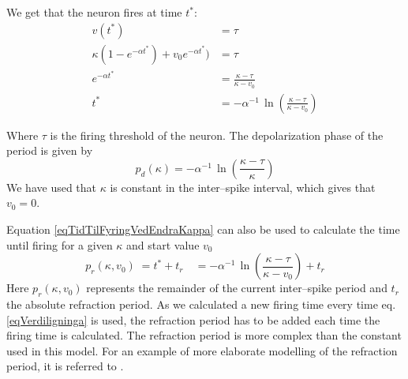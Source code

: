 We get that the neuron fires at time $t^*$:
\begin{equation}
	\begin{split}
			v(t^*) 					 							&= \tau \qquad 										\\	%
			\kappa (1-e^{-\alpha t^*}) + v_0 e^{-\alpha t^*})	&= \tau 											\\
			e^{-\alpha t^*} 			 						&= \frac{\kappa - \tau}{\kappa - v_0} 					\\
			t^*													&= -\alpha^{-1} \, \ln \left( \frac{\kappa - \tau}{\kappa - v_0} \right) 					
	\end{split}
	\label{eqTidTilFyringVedEndraKappa}
\end{equation}

Where $\tau$ is the firing threshold of the neuron. 
The depolarization phase of the period is given by
\begin{equation}
	p_d(\kappa) = -\alpha^{-1} \, \ln(\frac{\kappa - \tau}{\kappa})
	\label{eqPeriodeligningForKonstIntraPeriodKAPPA}
\end{equation}
We have used that $\kappa$ is constant in the inter--spike interval, which gives that $v_0 = 0$.

Equation \eqref{eqTidTilFyringVedEndraKappa} can also be used to calculate the time until firing for a given $\kappa$ and start value $v_0$
\begin{equation}
	p_{r}(\kappa, v_0) 	\;= t^* + t_r 
						\quad= -\alpha^{-1} \, \ln \left( \frac{\kappa - \tau}{\kappa - v_0} \right) + t_r
	\label{eqRemainderOfPeriod}
\end{equation}
Here $p_r(\kappa, v_0)$ represents the remainder of the current inter--spike period and $t_r$ the absolute refraction period. %
As we calculated a new firing time every time eq. \eqref{eqVerdiligninga} is used, the refraction period has to be added each time the firing time is calculated.
The refraction period is more complex than the constant used in this model. For an example of more elaborate modelling of the refraction period, it is referred to \cite{Kunkle02pulsedneural}.

